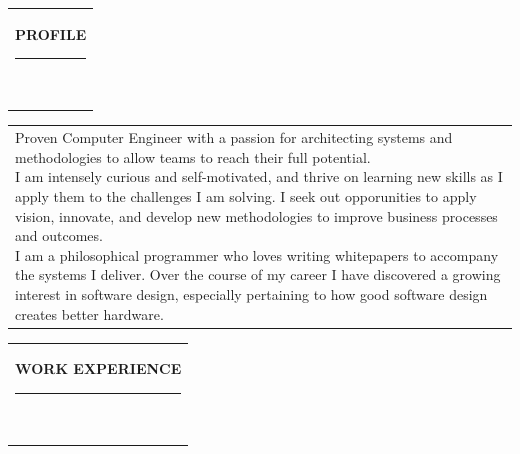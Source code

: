 \documentclass[10pt,A4]{article}
\newcommand{\mpwidth}{\linewidth-\fboxsep-\fboxsep}
\newcommand{\cvtext}[1] {
	\begin{tabular*}{1\mpwidth}{p{0.98\mpwidth}}
		\parbox{1\mpwidth}{#1}
	\end{tabular*}
}
\newcommand{\cvsection}[1] {
	\vspace{14pt}
	\cvtext{
		\textbf{\LARGE{\textcolor{darkcol}{\uppercase{#1}}}}\\[-4pt]
		\textcolor{maincol}{ \rule{0.1\textwidth}{2pt} } \\
	}
}
\begin{document}
\begin{paracol}{2}
\begin{rightcolumn}
\vfill\null
	\vspace{-10pt}
\cvsection{PROFILE}

\cvtext{
	Proven Computer Engineer with a passion for architecting systems and methodologies to allow teams to reach their full potential.\\

	I am intensely curious and self-motivated, and thrive on learning new skills as I apply them to the challenges I am solving.
	I seek out opporunities to apply vision, innovate,  and develop new methodologies to improve business processes and outcomes.\\

	I am a philosophical programmer who loves writing whitepapers to accompany the systems I deliver.
	Over the course of my career I have discovered a growing interest in software design, especially pertaining to how good software design creates better hardware.
}

\vfill\null
\cvsection{WORK EXPERIENCE}


\end{rightcolumn}
\end{paracol}
\end{document}
